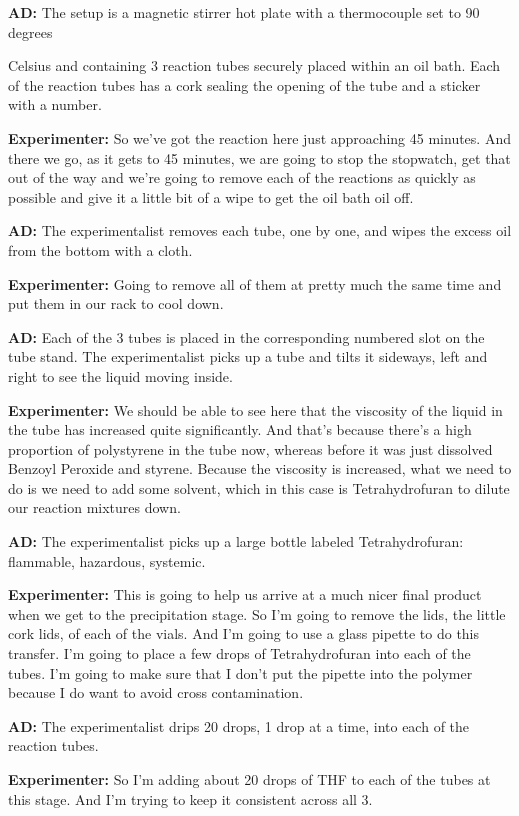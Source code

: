 \documentclass[11.5pt]{sig-alternate} %
\begin{document}
\begin{large}
\textbf{AD:} The setup is a magnetic stirrer hot plate with a thermocouple set to 90 degrees 

Celsius and containing 3 reaction tubes securely placed within an oil bath. Each of the reaction tubes has a cork sealing the opening of the tube and a sticker with a number. 

\textbf{Experimenter:}  So we've got the reaction here just approaching 45 minutes. And there we go, as it gets to 45 minutes, we are going to stop the stopwatch, get that out of the way and we're going to remove each of the reactions as quickly as possible and give it a little bit of a wipe to get the oil bath oil off. 

\textbf{AD:} The experimentalist removes each tube, one by one, and wipes the excess oil from the bottom with a cloth. 

\textbf{Experimenter:}  Going to remove all of them at pretty much the same time and put them in our rack to cool down. 

\textbf{AD:}  Each of the 3 tubes is placed in the corresponding numbered slot on the tube stand. The experimentalist picks up a tube and tilts it sideways, left and right to see the liquid moving inside. 

\textbf{Experimenter:}  We should be able to see here that the viscosity of the liquid in the tube has increased quite significantly. And that's because there's a high proportion of polystyrene in the tube now, whereas before it was just dissolved Benzoyl Peroxide and styrene. Because the viscosity is increased, what we need to do is we need to add some solvent, which in this case is Tetrahydrofuran to dilute our reaction mixtures down. 

\textbf{AD:}  The experimentalist picks up a large bottle labeled Tetrahydrofuran: flammable, hazardous, systemic. 

\textbf{Experimenter:} This is going to help us arrive at a much nicer final product when we get to the precipitation stage. So I'm going to remove the lids, the little cork lids, of each of the vials. And I'm going to use a glass pipette to do this transfer. I'm going to place a few drops of Tetrahydrofuran into each of the tubes. I'm going to make sure that I don't put the pipette into the polymer because I do want to avoid cross contamination. 

\textbf{AD:}  The experimentalist drips 20 drops, 1 drop at a time, into each of the reaction tubes. 

\textbf{Experimenter:}  So I'm adding about 20 drops of THF to each of the tubes at this stage. And I'm trying to keep it consistent across all 3. 


\end{large}
\end{document}
